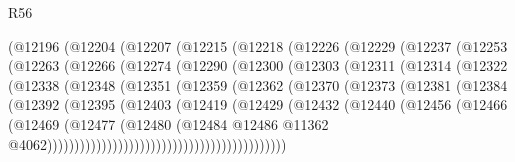 \begin{lexlean}{R56}
\begin{coremodule}
            (@12196
              (@12204
                (@12207
                  (@12215
                    (@12218
                      (@12226
                        (@12229
                          (@12237
                            (@12253
                              (@12263
                                (@12266
                                  (@12274
                                    (@12290
                                      (@12300
                                        (@12303
                                          (@12311
                                            (@12314
                                              (@12322
                                                (@12338
                                                  (@12348
                                                    (@12351
                                                      (@12359
                                                        (@12362
                                                          (@12370
                                                            (@12373
                                                              (@12381
                                                                (@12384
                                                                  (@12392
                                                                    (@12395
                                                                      (@12403
                                                                        (@12419
                                                                          (@12429
                                                                            (@12432
                                                                              (@12440
                                                                                (@12456
                                                                                  (@12466
                                                                                    (@12469
                                                                                      (@12477
                                                                                        (@12480
                                                                                          (@12484
                                                                                            @12486
                                                                                            @11362
                                                                                            @4062))))))))))))))))))))))))))))))))))))))))))))

\end{coremodule}
\end{lexlean}
